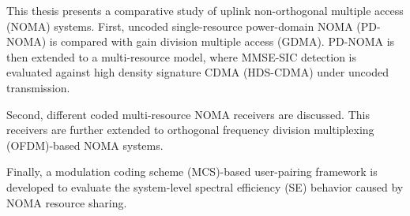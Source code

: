 
\begin{abstract}

本論文針對上行非正交的多重存取（non-orthogonal multiple access, NOMA）系統進行比較分析。首先，在未編碼單一資源系統中，比較功率域非正交的多重存取（power-domain NOMA, PD-NOMA）與分增益多重存取（gain division multiple access, GDMA）的錯誤率表現。
接著將功率域非正交的多重存取 (PD-NOMA) 延伸至多資源系統模型，並在未編碼傳輸下比較 MMSE-SIC 偵測器與高密度簽名碼分
碼多重存取（high density signature CDMA, HDS-CDMA）的效能。

其次，本論文探討不同的編碼多資源 NOMA 接收器，並進一步將這些接收器延伸至正交分頻多工（orthogonal frequency division multiplexing, OFDM）架構下的 NOMA 系統。

最後，我們提出一個基於調變編碼方式（modulation coding scheme, MCS）的使用者配對架構，用以評估 NOMA 資源共享對系統層級頻譜效率（spectral efficiency, SE）表現的影響。

\end{abstract}

\begin{abstract*}

This thesis presents a comparative study of uplink non-orthogonal multiple access (NOMA) systems. 
First, uncoded single-resource power-domain NOMA (PD-NOMA) is compared with gain division multiple access (GDMA). PD-NOMA is then extended to a multi-resource model, where MMSE-SIC detection is evaluated against high density signature CDMA (HDS-CDMA) under uncoded transmission. 

Second, different coded multi-resource NOMA receivers are discussed. This receivers are further extended to orthogonal frequency division multiplexing (OFDM)-based NOMA systems.

Finally, a modulation coding scheme (MCS)-based user-pairing framework is developed to evaluate the system-level spectral efficiency (SE) behavior caused by NOMA resource sharing.

\end{abstract*}